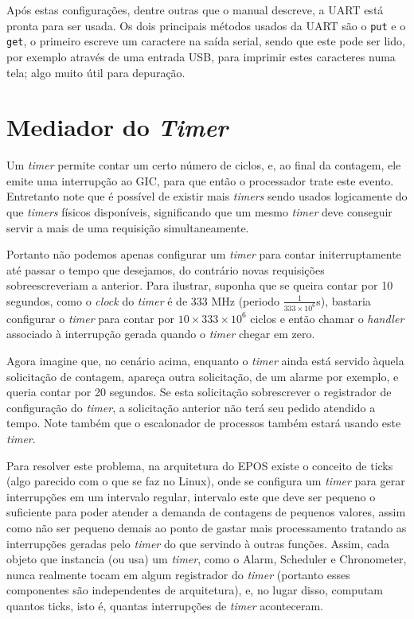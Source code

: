 Após estas configurações, dentre outras que o manual descreve, a UART está pronta para ser usada. Os dois principais métodos usados da UART são o \verb+put+ e o \verb+get+, o primeiro escreve um caractere na saída serial, sendo que este pode ser lido, por exemplo através de uma entrada USB, para imprimir estes caracteres numa tela; algo muito útil para depuração.


\section{Mediador do \emph{Timer}}

Um \emph{timer} permite contar um certo número de ciclos, e, ao final da contagem, ele emite uma interrupção ao GIC, para que então o processador trate este evento. Entretanto note que é possível de existir mais \emph{timers} sendo usados logicamente do que \emph{timers} físicos disponíveis, significando que um mesmo \emph{timer} deve conseguir servir a mais de uma requisição simultaneamente.

Portanto não podemos apenas configurar um \emph{timer} para contar initerruptamente até passar o tempo que desejamos, do contrário novas requisições sobreescreveriam a anterior. Para ilustrar, suponha que se queira contar por 10 segundos, como o \emph{clock} do \emph{timer} é de 333 MHz (periodo $\frac{1}{333 \times 10^6}$s), bastaria configurar o \emph{timer} para contar por $10 \times 333 \times 10^6$ ciclos e então chamar o \emph{handler} associado à interrupção gerada quando o \emph{timer} chegar em zero.

Agora imagine que, no cenário acima, enquanto o \emph{timer} ainda está servido àquela solicitação de contagem, apareça outra solicitação, de um alarme por exemplo, e queria contar por 20 segundos. Se esta solicitação sobrescrever o registrador de configuração do \emph{timer}, a solicitação anterior não terá seu pedido atendido a tempo. Note também que o escalonador de processos também estará usando este \emph{timer}.

Para resolver este problema, na arquitetura do EPOS existe o conceito de ticks (algo parecido com o que se faz no Linux), onde se configura um \emph{timer} para gerar interrupções em um intervalo regular, intervalo este que deve ser pequeno o suficiente para poder atender a demanda de contagens de pequenos valores, assim como não ser pequeno demais ao ponto de gastar mais processamento tratando as interrupções geradas pelo \emph{timer} do que servindo à outras funções. Assim, cada objeto que instancia (ou usa) um \emph{timer}, como o Alarm, Scheduler e Chronometer, nunca realmente tocam em algum registrador do \emph{timer} (portanto esses componentes são independentes de arquitetura), e, no lugar disso, computam quantos ticks, isto é, quantas interrupções de \emph{timer} aconteceram.

